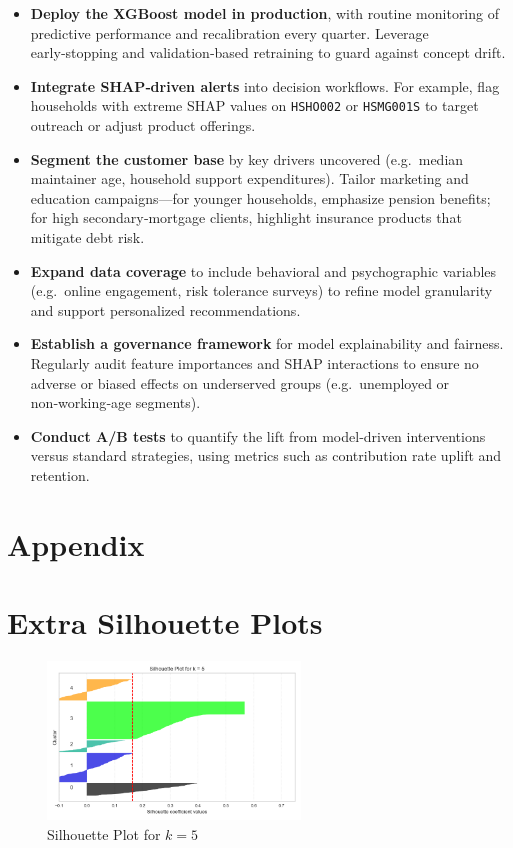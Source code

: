 \documentclass{article}
\begin{document}
\begin{itemize}
  \item \textbf{Deploy the XGBoost model in production}, with routine monitoring of predictive performance and recalibration every quarter. Leverage early‑stopping and validation‑based retraining to guard against concept drift.
  \item \textbf{Integrate SHAP‑driven alerts} into decision workflows. For example, flag households with extreme SHAP values on \texttt{HSHO002} or \texttt{HSMG001S} to target outreach or adjust product offerings.
  \item \textbf{Segment the customer base} by key drivers uncovered (e.g.\ median maintainer age, household support expenditures). Tailor marketing and education campaigns—for younger households, emphasize pension benefits; for high secondary‑mortgage clients, highlight insurance products that mitigate debt risk.
  \item \textbf{Expand data coverage} to include behavioral and psychographic variables (e.g.\ online engagement, risk tolerance surveys) to refine model granularity and support personalized recommendations.
  \item \textbf{Establish a governance framework} for model explainability and fairness. Regularly audit feature importances and SHAP interactions to ensure no adverse or biased effects on underserved groups (e.g.\ unemployed or non‑working‑age segments).
  \item \textbf{Conduct A/B tests} to quantify the lift from model‑driven interventions versus standard strategies, using metrics such as contribution rate uplift and retention.
\end{itemize}

\appendix
\section*{Appendix}
\section{Extra Silhouette Plots}

\begin{figure}[H]
    \centering
    \includegraphics[width=0.6\textwidth]{figures/silhouette_k5.png}
    \caption{Silhouette Plot for $k=5$}
    \label{fig:silhouette_k5}
\end{figure}
\end{document}
